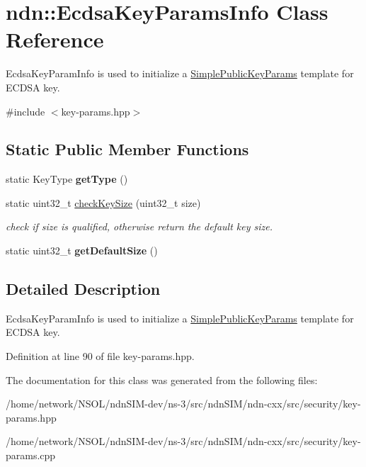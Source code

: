 \hypertarget{classndn_1_1EcdsaKeyParamsInfo}{}\section{ndn\+:\+:Ecdsa\+Key\+Params\+Info Class Reference}
\label{classndn_1_1EcdsaKeyParamsInfo}


Ecdsa\+Key\+Param\+Info is used to initialize a \hyperlink{classndn_1_1SimplePublicKeyParams}{Simple\+Public\+Key\+Params} template for E\+C\+D\+SA key.  




{\ttfamily \#include $<$key-\/params.\+hpp$>$}

\subsection*{Static Public Member Functions}
\begin{DoxyCompactItemize}
\item 
static Key\+Type {\bfseries get\+Type} ()\hypertarget{classndn_1_1EcdsaKeyParamsInfo_a16026f616a1dcbf10b3d8c0f471081df}{}\label{classndn_1_1EcdsaKeyParamsInfo_a16026f616a1dcbf10b3d8c0f471081df}

\item 
static uint32\+\_\+t \hyperlink{classndn_1_1EcdsaKeyParamsInfo_af8f5b412a16b802cd92c99778ad161c7}{check\+Key\+Size} (uint32\+\_\+t size)\hypertarget{classndn_1_1EcdsaKeyParamsInfo_af8f5b412a16b802cd92c99778ad161c7}{}\label{classndn_1_1EcdsaKeyParamsInfo_af8f5b412a16b802cd92c99778ad161c7}

\begin{DoxyCompactList}\small\item\em check if size is qualified, otherwise return the default key size. \end{DoxyCompactList}\item 
static uint32\+\_\+t {\bfseries get\+Default\+Size} ()\hypertarget{classndn_1_1EcdsaKeyParamsInfo_ac3243176421ba2379997b9f3594bead8}{}\label{classndn_1_1EcdsaKeyParamsInfo_ac3243176421ba2379997b9f3594bead8}

\end{DoxyCompactItemize}


\subsection{Detailed Description}
Ecdsa\+Key\+Param\+Info is used to initialize a \hyperlink{classndn_1_1SimplePublicKeyParams}{Simple\+Public\+Key\+Params} template for E\+C\+D\+SA key. 

Definition at line 90 of file key-\/params.\+hpp.



The documentation for this class was generated from the following files\+:\begin{DoxyCompactItemize}
\item 
/home/network/\+N\+S\+O\+L/ndn\+S\+I\+M-\/dev/ns-\/3/src/ndn\+S\+I\+M/ndn-\/cxx/src/security/key-\/params.\+hpp\item 
/home/network/\+N\+S\+O\+L/ndn\+S\+I\+M-\/dev/ns-\/3/src/ndn\+S\+I\+M/ndn-\/cxx/src/security/key-\/params.\+cpp\end{DoxyCompactItemize}
